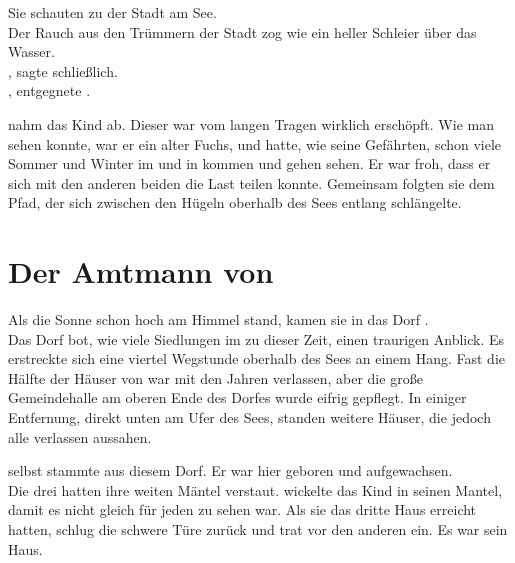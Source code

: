 \begin{huge}
Sie schauten zu der Stadt am See.\\
Der Rauch aus den Trümmern der Stadt {\Tern} zog wie ein heller Schleier über das Wasser.\\
, sagte {\Nox} schließlich.  
\\
, entgegnete {\Bomar}.\\

{\Bomar} nahm {\Eno} das Kind ab. Dieser war vom langen Tragen wirklich erschöpft. Wie man sehen konnte, war er ein alter Fuchs, und hatte, wie seine Gefährten, schon viele Sommer und Winter im {\Enland} und in {\Rhingell} kommen und gehen sehen. Er war froh, dass er sich mit den anderen beiden die Last teilen konnte. Gemeinsam folgten sie dem Pfad, der sich zwischen den Hügeln oberhalb des Sees entlang schlängelte.

\section{Der Amtmann von {\Berna}}
Als die Sonne schon hoch am Himmel stand, kamen sie in das Dorf {\Berna}.\\
Das Dorf bot, wie viele Siedlungen im {\Enland} zu dieser Zeit, einen traurigen Anblick. Es erstreckte sich eine viertel Wegstunde oberhalb des Sees an einem Hang. Fast die Hälfte der Häuser von {\Berna} war mit den Jahren verlassen, aber die große Gemeindehalle am oberen Ende des Dorfes wurde eifrig gepflegt. In einiger Entfernung, direkt unten am Ufer des Sees, standen weitere Häuser, die jedoch alle verlassen aussahen.

{\Bomar} selbst stammte aus diesem Dorf. Er war hier geboren und aufgewachsen.\\
Die drei {\Schattenlaufer} hatten ihre weiten Mäntel verstaut. {\Eno} wickelte das Kind in seinen Mantel, damit es nicht gleich für jeden zu sehen war. Als sie das dritte Haus erreicht hatten, schlug {\Bomar} die schwere Türe zurück und trat vor den anderen ein. Es war sein Haus.


\end{huge}
